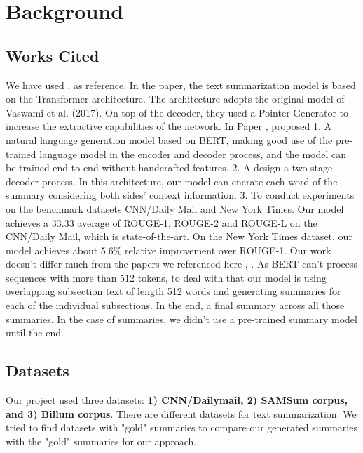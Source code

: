 \documentclass[twoside,twocolumn]{article}
\begin{document}

\section{Background}




\subsection{Works Cited}
We have used \cite{aksenov2020abstractive}, \cite{zhang2019pretraining} as reference. In the \cite{aksenov2020abstractive} paper, 
the text summarization model is based on the Transformer architecture. The architecture adopts the original model of Vaswami et al. (2017). 
On top of the decoder, they used a Pointer-Generator to increase the extractive capabilities of the network. In Paper \cite{zhang2019pretraining}, 
proposed 1. A natural language generation model based on BERT, making good use of the pre-trained language model in the encoder and decoder process, 
and the model can be trained end-to-end without handcrafted features. 2. A design a two-stage decoder process. In this architecture, our model can 
enerate each word of the summary considering both sides’ context information. 3. To conduct experiments on the benchmark datasets CNN/Daily Mail and 
New York Times. Our model achieves a 33.33 average of ROUGE-1, ROUGE-2 and ROUGE-L on the CNN/Daily Mail, which is state-of-the-art. On the New York 
Times dataset, our model achieves about 5.6\% relative improvement over ROUGE-1. 
Our work doesn't differ much from the papers we referenced here \cite{aksenov2020abstractive}, \cite{zhang2019pretraining}. As BERT can't process 
sequences with more than 512 tokens, to deal with that our model is using overlapping subsection text of length 512 words and generating summaries 
for each of the individual subsections. In the end, a final summary across all those summaries. In the case of summaries, we didn't use a pre-trained 
summary model until the end.



\subsection{Datasets}

Our project used three datasets: \textbf{1) CNN/Dailymail, 2) SAMSum corpus, and 3) Billum corpus}. There are different datasets for text summarization. 
We tried to find datasets with "gold" summaries to compare our generated summaries with the "gold" summaries for our approach.\par 
\end{document}
